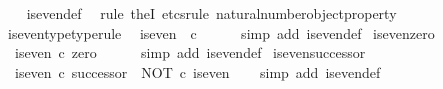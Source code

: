 \begin{isabellebody}
%
\isadelimproof
\ \ %
\endisadelimproof
%
\isatagproof
{}\isamarkupfalse%
\ is{\isacharunderscore}{\kern0pt}even{\isacharunderscore}{\kern0pt}def\ \isamarkupfalse%
\ {\isacharparenleft}{\kern0pt}rule\ theI{\isacharprime}{\kern0pt}{\isacharcomma}{\kern0pt}\ etcs{\isacharunderscore}{\kern0pt}rule\ natural{\isacharunderscore}{\kern0pt}number{\isacharunderscore}{\kern0pt}object{\isacharunderscore}{\kern0pt}property{}{\isacharparenright}{\kern0pt}%
\endisatagproof
{\isafoldproof}%
%
\isadelimproof
\isanewline
%
\endisadelimproof
\isanewline
{}\isamarkupfalse%
\ is{\isacharunderscore}{\kern0pt}even{\isacharunderscore}{\kern0pt}type{\isacharbrackleft}{\kern0pt}type{\isacharunderscore}{\kern0pt}rule{\isacharbrackright}{\kern0pt}{\isacharcolon}{\kern0pt}\isanewline
\ \ {\isachardoublequoteopen}is{\isacharunderscore}{\kern0pt}even\ {\isacharcolon}{\kern0pt}\ {\isasymnat}\isactrlsub c\ {\isasymrightarrow}\ {\isasymOmega}{\isachardoublequoteclose}\isanewline
%
\isadelimproof
\ \ %
\endisadelimproof
%
\isatagproof
{}\isamarkupfalse%
\ {\isacharparenleft}{\kern0pt}simp\ add{\isacharcolon}{\kern0pt}\ is{\isacharunderscore}{\kern0pt}even{\isacharunderscore}{\kern0pt}def{}{\isacharparenright}{\kern0pt}%
\endisatagproof
{\isafoldproof}%
%
\isadelimproof
\isanewline
%
\endisadelimproof
\isanewline
{}\isamarkupfalse%
\ is{\isacharunderscore}{\kern0pt}even{\isacharunderscore}{\kern0pt}zero{\isacharcolon}{\kern0pt}\isanewline
\ \ {\isachardoublequoteopen}is{\isacharunderscore}{\kern0pt}even\ {\isasymcirc}\isactrlsub c\ zero\ {\isacharequal}{\kern0pt}\ {\isasymt}{\isachardoublequoteclose}\isanewline
%
\isadelimproof
\ \ %
\endisadelimproof
%
\isatagproof
{}\isamarkupfalse%
\ {\isacharparenleft}{\kern0pt}simp\ add{\isacharcolon}{\kern0pt}\ is{\isacharunderscore}{\kern0pt}even{\isacharunderscore}{\kern0pt}def{}{\isacharparenright}{\kern0pt}%
\endisatagproof
{\isafoldproof}%
%
\isadelimproof
\isanewline
%
\endisadelimproof
\isanewline
{}\isamarkupfalse%
\ is{\isacharunderscore}{\kern0pt}even{\isacharunderscore}{\kern0pt}successor{\isacharcolon}{\kern0pt}\isanewline
\ \ {\isachardoublequoteopen}is{\isacharunderscore}{\kern0pt}even\ {\isasymcirc}\isactrlsub c\ successor\ {\isacharequal}{\kern0pt}\ NOT\ {\isasymcirc}\isactrlsub c\ is{\isacharunderscore}{\kern0pt}even{\isachardoublequoteclose}\isanewline
%
\isadelimproof
\ \ %
\endisadelimproof
%
\isatagproof
{}\isamarkupfalse%
\ {\isacharparenleft}{\kern0pt}simp\ add{\isacharcolon}{\kern0pt}\ is{\isacharunderscore}{\kern0pt}even{\isacharunderscore}{\kern0pt}def{}{\isacharparenright}{\kern0pt}%

\end{isabellebody}

